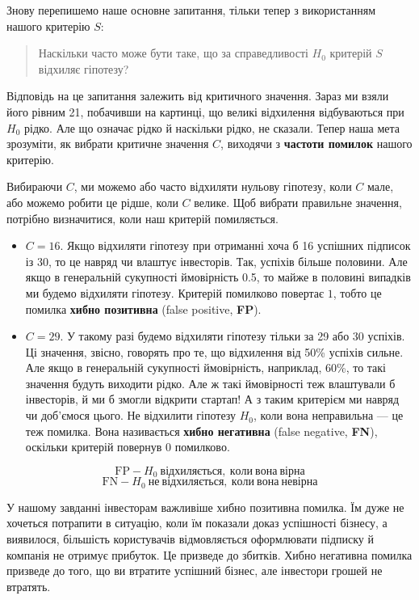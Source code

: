 \documentclass[
  letterpaper,
  10pt,
  openany]{report}
\theoremstyle{definition}
\theoremstyle{remark}
\begin{document}
Знову перепишемо наше основне запитання, тільки тепер з використанням
нашого критерію \(S\):

\begin{quote}
Наскільки часто може бути таке, що за справедливості \(H_0\) критерій
\(S\) відхиляє гіпотезу?
\end{quote}

Відповідь на це запитання залежить від критичного значення. Зараз ми
взяли його рівним 21, побачивши на картинці, що великі відхилення
відбуваються при \(H_0\) рідко. Але що означає рідко й наскільки рідко,
не сказали. Тепер наша мета зрозуміти, як вибрати критичне значення
\(C\), виходячи з \textbf{частоти помилок} нашого критерію.

Вибираючи \(C\), ми можемо або часто відхиляти нульову гіпотезу, коли
\(C\) мале, або можемо робити це рідше, коли \(C\) велике. Щоб вибрати
правильне значення, потрібно визначитися, коли наш критерій помиляється.

\begin{itemize}
\item
  \(C = 16\). Якщо відхиляти гіпотезу при отриманні хоча б 16 успішних
  підписок із 30, то це навряд чи влаштує інвесторів. Так, успіхів
  більше половини. Але якщо в генеральній сукупності ймовірність 0.5, то
  майже в половині випадків ми будемо відхиляти гіпотезу. Критерій
  помилково повертає \(1\), тобто це помилка \textbf{хибно позитивна}
  (false positive, \textbf{FP}).
\item
  \(C = 29\). У такому разі будемо відхиляти гіпотезу тільки за 29 або
  30 успіхів. Ці значення, звісно, говорять про те, що відхилення від
  50\% успіхів сильне. Але якщо в генеральній сукупності ймовірність,
  наприклад, 60\%, то такі значення будуть виходити рідко. Але ж такі
  ймовірності теж влаштували б інвесторів, й ми б змогли відкрити
  стартап! А з таким критерієм ми навряд чи доб'ємося цього. Не
  відхилити гіпотезу \(H_0\), коли вона неправильна --- це теж помилка.
  Вона називається \textbf{хибно негативна} (false negative,
  \textbf{FN}), оскільки критерій повернув 0 помилково.
\end{itemize}

\[ \text{FP} - H_0\ відхиляється,\ коли\ вона\ вірна \]
\[ \text{FN} - H_0\ не\ відхиляється,\ коли\ вона\ не вірна \]

У нашому завданні інвесторам важливіше хибно позитивна помилка. Їм дуже
не хочеться потрапити в ситуацію, коли їм показали доказ успішності
бізнесу, а виявилося, більшість користувачів відмовляється оформлювати
підписку й компанія не отримує прибуток. Це призведе до збитків. Хибно
негативна помилка призведе до того, що ви втратите успішний бізнес, але
інвестори грошей не втратять.
\end{document}

